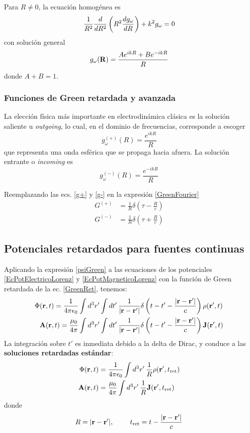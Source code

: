 \documentclass[]{article}
\numberwithin{equation}{section}
\begin{document}
Para \(R \neq 0\), la ecuación homogénea es
\begin{equation*}
	\frac{1}{R^2} \dfrac{d }{d R^2}\left(R^2 \dfrac{d g_{\omega}}{d R}\right) + k^2 g_{\omega} = 0
\end{equation*}
con solución general
\begin{equation}
	g_{\omega}(\mathbf{R}) = \frac{A e^{ikR} + B e^{-ikR}}{R}
\end{equation}
donde \(A + B = 1\).

\subsubsection{Funciones de Green retardada y avanzada}
La elección física más importante en electrodinámica clásica es la solución saliente u \textit{outgoing}, lo cual, en el dominio de frecuencias, corresponde a escoger
\begin{equation}
	g_{\omega}^{(+)} (R) = \frac{e^{ikR}}{R} \label{g+}
\end{equation}
que representa una onda esférica que se propaga hacia afuera. La solución entrante o \textit{incoming} es
\begin{equation}
	g_{\omega}^{(-)} (R) = \frac{e^{-ikR}}{R} \label{g-}
\end{equation}

Reemplazando las ecs. \ref{g+} y \ref{g-} en la expresión \ref{GreenFourier}
\begin{align}
	G^{(+)} &= \frac{1}{R} \delta\left(\tau - \frac{R}{c}\right) \label{GreenRet}\\
	G^{(-)} &= \frac{1}{R} \delta\left(\tau + \frac{R}{c}\right) \label{GreenAdv}
\end{align}

\subsection{Potenciales retardados para fuentes continuas}
Aplicando la expresión \ref{psiGreen} a las ecuaciones de los potenciales \ref{EcPotElectricoLorenz} y \ref{EcPotMagneticoLorenz} con la función de Green retardada de la ec. \ref{GreenRet}, tenemos:
\begin{align*}
	\Phi(\rv,t)  = \ke &\int d^3r' \int dt' \, \frac{1}{|\rdif|} \delta\left(t - t' - \frac{|\rdif|}{c}\right) \rho(\rv',t)\\
	\n{A}(\rv,t) = \ku &\int d^3r' \int dt' \, \frac{1}{|\rdif|} \delta\left(t - t' - \frac{|\rdif|}{c}\right) \n{J}(\rv',t)
\end{align*}
La integración sobre \(t'\) es inmediata debido a la delta de Dirac, y conduce a las \textbf{soluciones retardadas estándar}:
\begin{align}
	\Phi(\rv,t)  &= \ke \int d^3r' \, \frac{1}{R} \rho (\rv',t_{\mathrm{ret}}) \label{potElec_ret}\\
	\n{A}(\rv,t) &= \ku \int d^3r' \, \frac{1}{R} \n{J}(\rv',t_{\mathrm{ret}}) \label{potMagn_ret}
\end{align}
donde
\begin{equation}
	R = |\mathbf{r} - \mathbf{r}'|, ~~~~~~~ t_{\mathrm{ret}} = t - \frac{|\mathbf{r} - \mathbf{r}'|}{c}
\end{equation}
\end{document}
